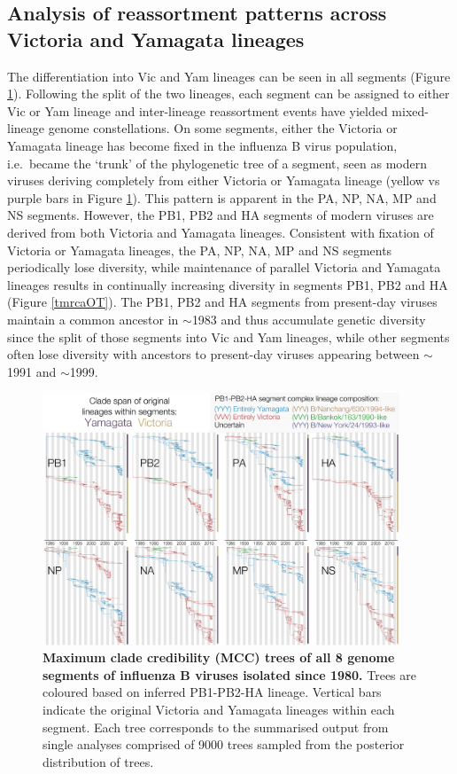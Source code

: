 \documentclass[11pt,oneside,letterpaper]{article}
\begin{document}
\subsection*{Analysis of reassortment patterns across Victoria and Yamagata lineages}
The differentiation into Vic and Yam lineages can be seen in all segments (Figure \ref{genomeGrid}).
Following the split of the two lineages, each segment can be assigned to either Vic or Yam lineage and inter-lineage reassortment events have yielded mixed-lineage genome constellations.
On some segments, either the Victoria or Yamagata lineage has become fixed in the influenza B virus population, i.e.\ became the `trunk' of the phylogenetic tree of a segment, seen as modern viruses deriving completely from either Victoria or Yamagata lineage (yellow vs purple bars in Figure \ref{genomeGrid}).
This pattern is apparent in the PA, NP, NA, MP and NS segments.
However, the PB1, PB2 and HA segments of modern viruses are derived from both Victoria and Yamagata lineages.
Consistent with fixation of Victoria or Yamagata lineages, the PA, NP, NA, MP and NS segments periodically lose diversity, while maintenance of parallel Victoria and Yamagata lineages results in continually increasing diversity in segments PB1, PB2 and HA (Figure \ref{tmrcaOT}).
The PB1, PB2 and HA segments from present-day viruses maintain a common ancestor in $\sim$1983 and thus accumulate genetic diversity since the split of those segments into Vic and Yam lineages, while other segments often lose diversity with ancestors to present-day viruses appearing between $\sim$1991 and $\sim$1999.

\begin{figure}[h]
\centering
\includegraphics[width=0.95\textwidth]{figures/InfB_genomeGrid.pdf}
\caption{\textbf{Maximum clade credibility (MCC) trees of all 8 genome segments of influenza B viruses isolated since 1980.}
Trees are coloured based on inferred PB1-PB2-HA lineage.
Vertical bars indicate the original Victoria and Yamagata lineages within each segment.
Each tree corresponds to the summarised output from single analyses comprised of 9000 trees sampled from the posterior distribution of trees.
}
\label{genomeGrid}
\end{figure}
\end{document}
